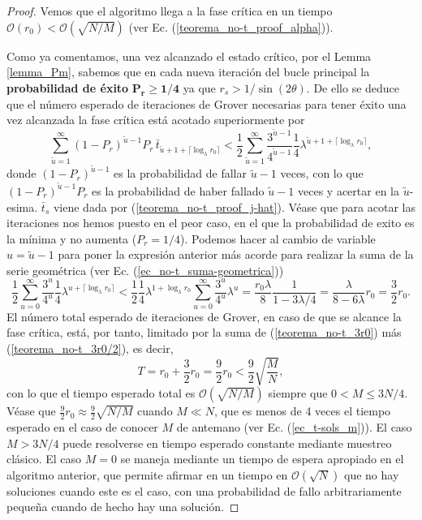 \documentclass[a4paper,11pt]{book} %
\numberwithin{equation}{chapter}
\begin{document}
\begin{proof}
Vemos que el algoritmo llega a la fase crítica en un tiempo $\mathcal{O} (r_0) < \mathcal{O}(\sqrt{N/M})$ (ver Ec. (\ref{teorema_no-t_proof_alpha})). 

Como ya comentamos, una vez alcanzado el estado crítico, por el Lemma \ref{lemma_Pm}, sabemos que en cada nueva iteración del bucle principal la \textbf{probabilidad de éxito} $\bm{P_r \geq 1/4}$ ya que $r_s > 1/\sin (2 \theta)$. De ello se deduce que el número esperado de iteraciones de Grover necesarias para tener éxito una vez alcanzada la fase crítica está acotado superiormente por
\begin{equation}
\sum_{\tilde{u}=1}^\infty (1-P_r)^{\tilde{u}-1} P_r \, \bar{t}_{\tilde{u}+1+\lceil \log_\lambda r_0 \rceil} < \frac{1}{2} \sum_{\tilde{u}=1}^\infty \frac{3^{\tilde{u}-1}}{4^{\tilde{u}-1}} \frac{1}{4} \lambda^{\tilde{u}+1+\lceil \log_\lambda r_0 \rceil},
\end{equation}
donde $(1-P_r)^{\tilde{u}-1}$ es la probabilidad de fallar $\tilde{u}-1$ veces, con lo que $(1-P_r)^{\tilde{u}-1} P_r$ es la probabilidad de haber fallado $\tilde{u}-1$ veces y acertar en la $\tilde{u}$-esima. $\bar{t}_s$ viene dada por (\ref{teorema_no-t_proof_j-hat}). Véase que para acotar las iteraciones nos hemos puesto en el peor caso, en el que la probabilidad de exito es la mínima y no aumenta ($P_r = 1/4$). Podemos hacer al cambio de variable $u = \tilde{u} -1$ para poner la expresión anterior más acorde para realizar la suma de la serie geométrica (ver Ec. (\ref{ec_no-t_suma-geometrica}))
\begin{equation} \label{teorema_no-t_3r0/2}
\frac{1}{2} \sum_{u=0}^\infty \frac{3^{u}}{4^{u}} \frac{1}{4} \lambda^{u+\lceil \log_\lambda r_0 \rceil} 
< 
\frac{1}{2}  \frac{1}{4} \lambda^{1+ \log_\lambda r_0}  \sum_{u=0}^\infty \frac{3^{u}}{4^{u}} \lambda^{u} 
= 
\frac{r_0 \lambda}{8} \frac{1}{1-3 \lambda/4} 
= \frac{\lambda}{8-6 \lambda}r_0 = \boxed{ \frac{3}{2} r_0}.
\end{equation}
El número total esperado de iteraciones de Grover, en caso de que se alcance la fase crítica, está, por tanto, limitado por la suma de (\ref{teorema_no-t_3r0}) más (\ref{teorema_no-t_3r0/2}), es decir, 
\begin{equation}
T = r_0 + \frac{3}{2} r_0 = \frac{9}{2} r_0 < \frac{9}{2} \sqrt{\frac{M}{N}},
\end{equation}  
con lo que el tiempo esperado total es $\mathcal{O}(\sqrt{N/M})$ siempre que $0 < M \leq 3N/4$. Véase que $\frac{9}{2} r_0 \approx \frac{9}{2} \sqrt{N/M}$ cuando $M \ll N$, que es menos de 4 veces el tiempo esperado en el caso de conocer $M$ de antemano (ver Ec. (\ref{ec_t-sols_m})). El caso $M > 3N/4$ puede resolverse en tiempo esperado constante mediante muestreo clásico. El caso $M = 0$ se maneja mediante un tiempo de espera apropiado en el algoritmo anterior, que permite afirmar en un tiempo en $\mathcal{O} (\sqrt{N})$ que no hay soluciones cuando este es el caso, con una probabilidad de fallo arbitrariamente pequeña cuando de hecho hay una solución.
\end{proof}
\end{document}
